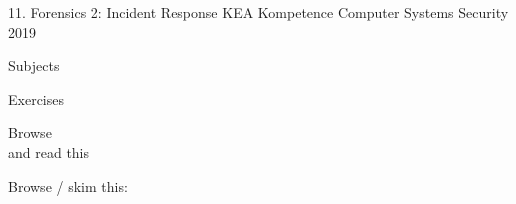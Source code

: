 \documentclass[Screen16to9,17pt]{foils}
\begin{document}
\mytitlepage
{11. Forensics 2: Incident Response}
{KEA Kompetence Computer Systems Security 2019}



\begin{list1}
\item Subjects
\begin{list2}
\item
\item
\item
\end{list2}
\item Exercises
\begin{list2}
\item
\item
\end{list2}
\end{list1}




\begin{list1}
\item Browse\\

and read this\\

\item Browse / skim this:\\

\end{list1}




\slidenext
\end{document}

